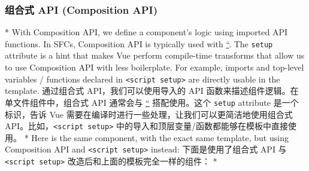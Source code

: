 \begin{paracol}{2}
\subsubsection{组合式 API (Composition API)}
\switchcolumn[0]*%
With Composition API, we define a component's logic using imported API
functions. In SFCs, Composition API is typically used with
\href{https://vuejs.org/api/sfc-script-setup}{``}. The \texttt{setup}
attribute is a hint that makes Vue perform compile-time transforms that
allow us to use Composition API with less boilerplate. For example,
imports and top-level variables / functions declared in
\texttt{\textless{}script\ setup\textgreater{}} are directly usable in
the template.
\switchcolumn
通过组合式 API，我们可以使用导入的 API
函数来描述组件逻辑。在单文件组件中，组合式 API 通常会与
\href{https://cn.vuejs.org/api/sfc-script-setup.html}{``} 搭配使用。这个
\texttt{setup} attribute 是一个标识，告诉 Vue
需要在编译时进行一些处理，让我们可以更简洁地使用组合式
API。比如，\texttt{\textless{}script\ setup\textgreater{}}
中的导入和顶层变量/函数都能够在模板中直接使用。
\switchcolumn[0]*%
Here is the same component, with the exact same template, but using
Composition API and \texttt{\textless{}script\ setup\textgreater{}}
instead:
\switchcolumn
下面是使用了组合式 API 与
\texttt{\textless{}script\ setup\textgreater{}}
改造后和上面的模板完全一样的组件：
\switchcolumn[0]*%
\switchcolumn
{}
\end{paracol}
